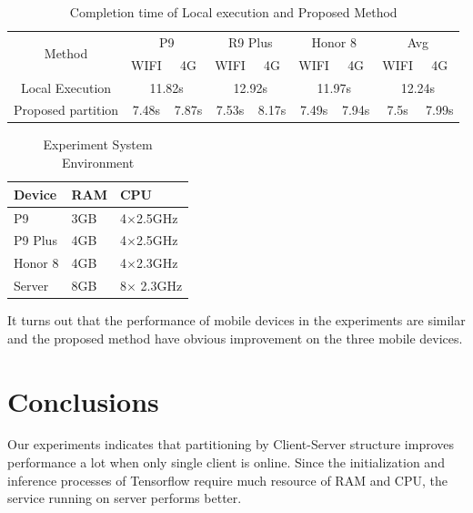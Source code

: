 \documentclass[a4paper,12pt,onecolumn,twoside]{article}
\begin{document}
\begin{CJK*}{GBK}{song}
  \begin{table}[!hbt]
    \caption{Completion time of Local execution and Proposed Method}
  \centering\label{tb:result}
    \begin{tabular}{|c|c|c|c|c|c|c|c|c|}
    \hline
    \multirow{2}{*}{Method} & \multicolumn{2}{c|}{P9}    & \multicolumn{2}{c|}{R9 Plus} & \multicolumn{2}{c|}{Honor 8} & \multicolumn{2}{c|}{Avg}   \\ \cline{2-9} 
                            & WIFI         & 4G          & WIFI          & 4G           & WIFI          & 4G           & WIFI         & 4G          \\ \hline
    Local Execution         & \multicolumn{2}{c|}{11.82s} & \multicolumn{2}{c|}{12.92s}   & \multicolumn{2}{c|}{11.97s}   & \multicolumn{2}{c|}{12.24s} \\ \hline
    Proposed partition      & 7.48s         & 7.87s        & 7.53s          & 8.17s         & 7.49s          & 7.94s        & 7.5s          & 7.99s       \\ \hline
    \end{tabular}
    \end{table}

  \begin{table}[!hbt]
    \centering
    \caption{Experiment System Environment}\label{tab:env}
    \begin{tabular}{|l|l|l|}
      \hline
      \textbf{Device} & \textbf{RAM} & \textbf{CPU} \\
      \hline
      P9 & 3GB & 4$\times$2.5GHz \\
      \hline
      P9 Plus & 4GB & 4$\times$2.5GHz \\
      \hline
      Honor 8 & 4GB & 4$\times$2.3GHz \\
      \hline
      Server & 8GB & 8$\times$ 2.3GHz \\
      \hline
    \end{tabular}
  \end{table}

It turns out that the performance of mobile devices in the experiments
are similar and the proposed method have obvious improvement 
on the three mobile devices.

\section{Conclusions}

Our experiments indicates that partitioning by Client-Server structure improves performance a lot when only single client is online. Since the initialization and inference processes of Tensorflow require much resource of RAM and CPU, the service running on server performs better.


\end{CJK*}
\end{document}
